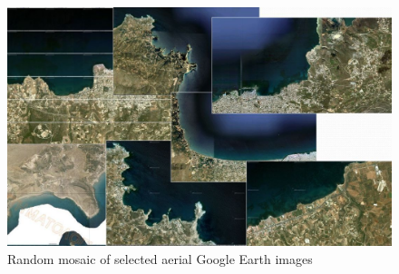 \documentclass[10pt, a4paper]{article}
\begin{document}
\begin{appendices}
\begin{figure}[H]
	\begin{center}
		\includegraphics[scale=0.25]{App-8.jpg}
		\caption{Random mosaic of selected aerial Google Earth images}
	\end{center}
	\label{fig:68}	
\end{figure}
\pagebreak


\end{appendices}
\end{document}
